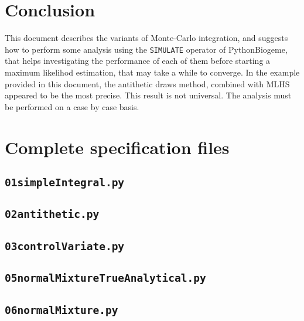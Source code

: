 \documentclass[12pt,a4paper]{article}
\newcommand{\PBIOGEME}{PythonBiogeme}
\begin{document}
\section{Conclusion}

This document describes the variants of Monte-Carlo integration, and
suggests how to perform some analysis using the \lstinline$SIMULATE$
operator of \PBIOGEME, that helps investigating the performance of
each of them before starting a maximum likelihod  estimation, that may
take a while to converge. In the example provided in this document,
the antithetic draws method, combined with MLHS appeared to be the
most precise. This result is not universal. The analysis must be
performed on a case by case basis.

\clearpage

\appendix

\section{Complete specification files}

\subsection{\lstinline$01simpleIntegral.py$}
\label{sec:01simpleIntegral}


\subsection{\lstinline$02antithetic.py$}
\label{sec:02antithetic}


\subsection{\lstinline$03controlVariate.py$}
\label{sec:03controlVariate}


\subsection{\lstinline$05normalMixtureTrueAnalytical.py$}
\label{sec:05normalMixtureTrueAnalytical}


\subsection{\lstinline$06normalMixture.py$}
\label{sec:06normalMixture}

\end{document}
